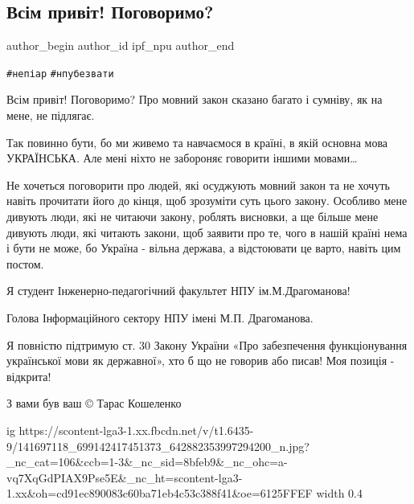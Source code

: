  
 
 
 
 
 
\subsection{Всім привіт! Поговоримо?}
\label{sec:24_01_2021.fb.ipf_npu.1.mova_zakon}
 
\ifcmt
 author_begin
   author_id ipf_npu
 author_end
\fi

\verb|#непіар| \verb|#нпубезвати| 

Всім привіт! Поговоримо? Про мовний закон сказано багато і сумніву, як на мене,
не підлягає.

Так повинно бути, бо ми живемо та навчаємося в країні, в якій основна мова
УКРАЇНСЬКА. Але мені ніхто не забороняє говорити іншими мовами…

Не хочеться поговорити про людей, які осуджують мовний закон та не хочуть
навіть прочитати його до кінця, щоб зрозуміти суть цього закону. Особливо мене
дивують люди, які не читаючи закону, роблять висновки, а ще більше мене дивують
люди, які читають закони, щоб заявити про те, чого в нашій країні нема і бути
не може, бо Україна - вільна держава, а відстоювати це варто, навіть цим
постом. 

Я студент Інженерно-педагогічний факультет НПУ ім.М.Драгоманова!

Голова Інформаційного сектору НПУ імені М.П. Драгоманова. 

Я повністю підтримую ст. 30 Закону України «Про забезпечення функціонування
української мови як державної», хто б що не говорив або писав! Моя позиція -
відкрита!

З вами був ваш © Тарас Кошеленко

\ifcmt
  ig https://scontent-lga3-1.xx.fbcdn.net/v/t1.6435-9/141697118_699142417451373_642882353997294200_n.jpg?_nc_cat=106&ccb=1-3&_nc_sid=8bfeb9&_nc_ohc=a-vq7XqGdPIAX9Pse5E&_nc_ht=scontent-lga3-1.xx&oh=cd91ec890083c60ba71eb4c53c388f41&oe=6125FFEF
  width 0.4
\fi
